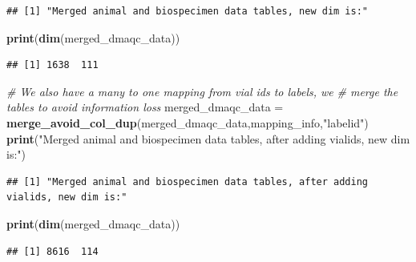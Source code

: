\documentclass[]{article}
\newenvironment{Shaded}{\begin{snugshade}}{\end{snugshade}}
\newcommand{\KeywordTok}[1]{\textcolor[rgb]{0.13,0.29,0.53}{\textbf{#1}}}
\newcommand{\StringTok}[1]{\textcolor[rgb]{0.31,0.60,0.02}{#1}}
\newcommand{\CommentTok}[1]{\textcolor[rgb]{0.56,0.35,0.01}{\textit{#1}}}
\newcommand{\NormalTok}[1]{#1}
\begin{document}
\begin{verbatim}
## [1] "Merged animal and biospecimen data tables, new dim is:"
\end{verbatim}

\begin{Shaded}
\begin{Highlighting}[]
\KeywordTok{print}\NormalTok{(}\KeywordTok{dim}\NormalTok{(merged_dmaqc_data))}
\end{Highlighting}
\end{Shaded}

\begin{verbatim}
## [1] 1638  111
\end{verbatim}

\begin{Shaded}
\begin{Highlighting}[]
\CommentTok{# We also have a many to one mapping from vial ids to labels, we }
\CommentTok{# merge the tables to avoid information loss}
\NormalTok{merged_dmaqc_data =}\StringTok{ }\KeywordTok{merge_avoid_col_dup}\NormalTok{(merged_dmaqc_data,mapping_info,}\StringTok{"labelid"}\NormalTok{)}
\KeywordTok{print}\NormalTok{(}\StringTok{"Merged animal and biospecimen data tables, after adding vialids, new dim is:"}\NormalTok{)}
\end{Highlighting}
\end{Shaded}

\begin{verbatim}
## [1] "Merged animal and biospecimen data tables, after adding vialids, new dim is:"
\end{verbatim}

\begin{Shaded}
\begin{Highlighting}[]
\KeywordTok{print}\NormalTok{(}\KeywordTok{dim}\NormalTok{(merged_dmaqc_data))}
\end{Highlighting}
\end{Shaded}

\begin{verbatim}
## [1] 8616  114
\end{verbatim}
\end{document}

